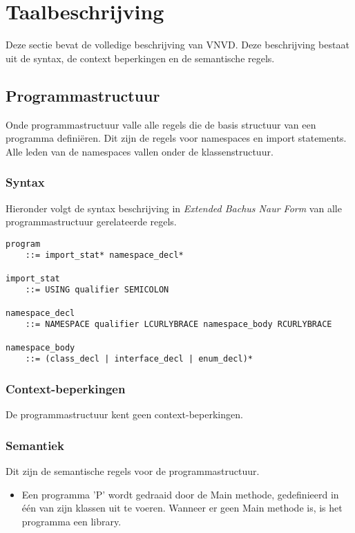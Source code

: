 \section{Taalbeschrijving}
Deze sectie bevat de volledige beschrijving van VNVD. Deze beschrijving bestaat uit de syntax, de context beperkingen en de semantische regels.

\subsection{Programmastructuur}
Onde programmastructuur valle alle regels die de basis structuur van een programma defini\"eren. Dit zijn de regels voor namespaces en import statements. Alle leden van de namespaces vallen onder de klassenstructuur.

\subsubsection{Syntax}
Hieronder volgt de syntax beschrijving in \textit{Extended Bachus Naur Form} van alle programmastructuur gerelateerde regels.

\begin{lstlisting}
program
	::=	import_stat* namespace_decl*

import_stat
	::=	USING qualifier SEMICOLON

namespace_decl
	::=	NAMESPACE qualifier LCURLYBRACE namespace_body RCURLYBRACE

namespace_body
	::=	(class_decl | interface_decl | enum_decl)*
\end{lstlisting}

\subsubsection{Context-beperkingen}
De programmastructuur kent geen context-beperkingen.

\subsubsection{Semantiek}
Dit zijn de semantische regels voor de programmastructuur.

\begin{itemize}
	\item Een programma 'P' wordt gedraaid door de Main methode, gedefinieerd in \'e\'en van zijn klassen uit te voeren. Wanneer er geen Main methode is, is het programma een library.
\end{itemize}

